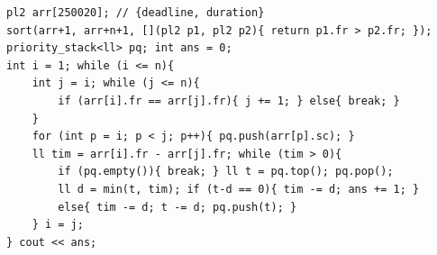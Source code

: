 \begin{verbatim}
pl2 arr[250020]; // {deadline, duration}
sort(arr+1, arr+n+1, [](pl2 p1, pl2 p2){ return p1.fr > p2.fr; });
priority_stack<ll> pq; int ans = 0;
int i = 1; while (i <= n){
	int j = i; while (j <= n){
		if (arr[i].fr == arr[j].fr){ j += 1; } else{ break; }
	}
	for (int p = i; p < j; p++){ pq.push(arr[p].sc); }
	ll tim = arr[i].fr - arr[j].fr; while (tim > 0){
		if (pq.empty()){ break; } ll t = pq.top(); pq.pop();
		ll d = min(t, tim); if (t-d == 0){ tim -= d; ans += 1; }
		else{ tim -= d; t -= d; pq.push(t); }
	} i = j;
} cout << ans;
\end{verbatim}